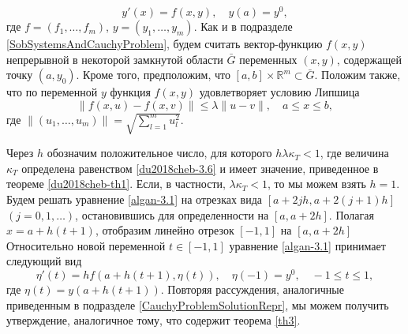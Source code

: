 \begin{equation}\label{algan-3.1}
y'(x)=f(x,y), \quad y(a)=y^0,
\end{equation}
где  $f=(f_1, \ldots, f_m)$, $y=(y_1, \ldots, y_m)$. Как и в подразделе \ref{SobSystemsAndCauchyProblem}, будем считать вектор-функцию $f(x,y)$  непрерывной в некоторой замкнутой  области $\bar G$ переменных $(x,y)$, содержащей точку $(a,y_0)$. Кроме того, предположим, что $[a,b]\times\mathbb{R}^m\subset\bar G$. Положим также, что по переменной $y$ функция $f(x,y)$ удовлетворяет условию Липшица
 \begin{equation}\label{algan-3.2}
\|f(x,u)-f(x,v)\|\le \lambda\|u-v\|, \quad a\le x \le b,
\end{equation}
где $\|(u_1,\ldots,u_m)\|=\sqrt{\sum_{l=1}^m u_l^2}$.

Через $h$ обозначим положительное число, для которого $h\lambda\kappa_T<1$, где  величина $\kappa_T$ определена равенством \eqref{du2018cheb-3.6} и имеет значение, приведенное в теореме \ref{du2018cheb-th1}. Если, в частности, $\lambda\kappa_T<1$, то мы можем взять $h=1$. Будем  решать уравнение \eqref{algan-3.1} на отрезках вида $[a+2jh,a+2(j+1)h]$ $(j=0,1,\ldots)$, остановившись для определенности на $[a,a+2h]$. Полагая $x=a+h(t+1)$, отобразим линейно отрезок $[-1,1]$ на $[a,a+2h]$   Относительно новой переменной $t\in [-1,1]$ уравнение \eqref{algan-3.1} принимает следующий вид
\begin{equation}\label{algan-3.3}
\eta'(t)=hf(a+h(t+1),\eta(t)), \quad \eta(-1)=y^0,\quad -1\le t\le  1,
\end{equation}
где $\eta(t)=y(a+h(t+1))$.
Повторяя рассуждения, аналогичные приведенным в подразделе \ref{CauchyProblemSolutionRepr}, мы можем получить утверждение, аналогичное тому, что содержит теорема \ref{th3}.


